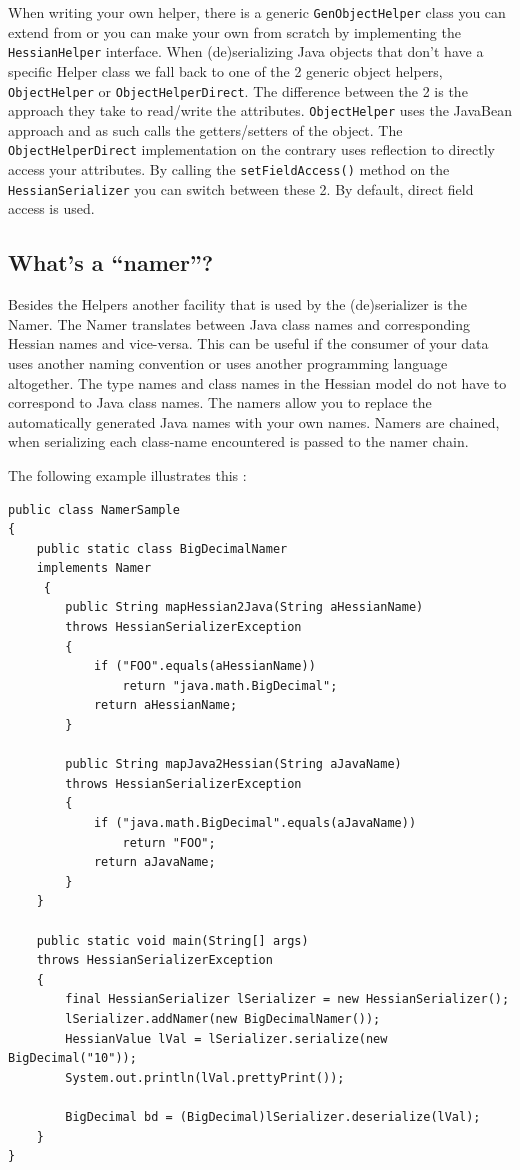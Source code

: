 \documentclass[a4paper]{article}
\begin{document}
When writing your own helper, there is a generic \lstinline$GenObjectHelper$ class you can extend from or you can make your own from scratch by implementing the \lstinline$HessianHelper$ interface.  When (de)serializing Java objects that don't have a specific Helper class we fall back to one of the 2 generic object helpers, \lstinline$ObjectHelper$ or \lstinline$ObjectHelperDirect$. The difference between the 2 is the approach they take to read/write the attributes. \lstinline$ObjectHelper$ uses the JavaBean approach and as such calls the getters/setters of the object.  The \lstinline$ObjectHelperDirect$ implementation on the contrary uses reflection to directly access your attributes. By calling the \lstinline$setFieldAccess()$ method on the \lstinline$HessianSerializer$ you can switch between these 2. 
By default, direct field access is used.

\subsection{What's a ``namer''?}

Besides the Helpers another facility that is used by the (de)serializer is the Namer. The Namer translates between Java class names and corresponding Hessian names and vice-versa. This can be useful if the consumer of your data uses another naming convention or uses another programming language altogether. The type names and class names in the Hessian model do not have to correspond to Java class names. The namers allow you to replace the automatically generated Java names with your own names. Namers are chained, when serializing each class-name encountered is passed to the namer chain.

The following example illustrates this :

\medskip
\begin{lstlisting}
public class NamerSample
{
    public static class BigDecimalNamer 
    implements Namer
     {
        public String mapHessian2Java(String aHessianName) 
        throws HessianSerializerException
        {
            if ("FOO".equals(aHessianName))
                return "java.math.BigDecimal";
            return aHessianName;
        }

        public String mapJava2Hessian(String aJavaName) 
        throws HessianSerializerException
        {
            if ("java.math.BigDecimal".equals(aJavaName))
                return "FOO";
            return aJavaName;
        }
    }

    public static void main(String[] args) 
    throws HessianSerializerException
    {
        final HessianSerializer lSerializer = new HessianSerializer();
        lSerializer.addNamer(new BigDecimalNamer());
        HessianValue lVal = lSerializer.serialize(new BigDecimal("10"));
        System.out.println(lVal.prettyPrint());

        BigDecimal bd = (BigDecimal)lSerializer.deserialize(lVal);
    }
}
\end{lstlisting}
\medskip
\end{document}
